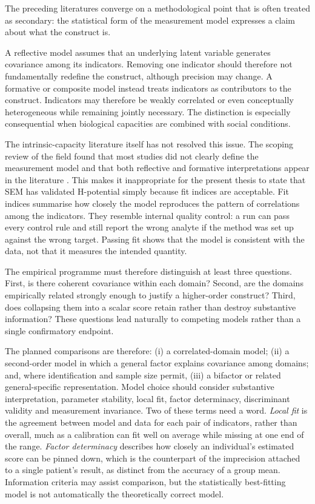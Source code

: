 The preceding literatures converge on a methodological point that is often treated as secondary: the statistical form of the measurement model expresses a claim about what the construct is.

A reflective model assumes that an underlying latent variable generates covariance among its indicators. Removing one indicator should therefore not fundamentally redefine the construct, although precision may change. A formative or composite model instead treats indicators as contributors to the construct. Indicators may therefore be weakly correlated or even conceptually heterogeneous while remaining jointly necessary. The distinction is especially consequential when biological capacities are combined with social conditions.

The intrinsic-capacity literature itself has not resolved this issue. The scoping review of the field found that most studies did not clearly define the measurement model and that both reflective and formative interpretations appear in the literature \citep{koivunen_2022}. This makes it inappropriate for the present thesis to state that SEM has validated H-potential simply because fit indices are acceptable. Fit indices summarise how closely the model reproduces the pattern of correlations among the indicators. They resemble internal quality control: a run can pass every control rule and still report the wrong analyte if the method was set up against the wrong target. Passing fit shows that the model is consistent with the data, not that it measures the intended quantity.

The empirical programme must therefore distinguish at least three questions. First, is there coherent covariance within each domain? Second, are the domains empirically related strongly enough to justify a higher-order construct? Third, does collapsing them into a scalar score retain rather than destroy substantive information? These questions lead naturally to competing models rather than a single confirmatory endpoint.

The planned comparisons are therefore: (i) a correlated-domain model; (ii) a second-order model in which a general factor explains covariance among domains; and, where identification and sample size permit, (iii) a bifactor or related general-specific representation. Model choice should consider substantive interpretation, parameter stability, local fit, factor determinacy, discriminant validity and measurement invariance. Two of these terms need a word. \emph{Local fit} is the agreement between model and data for each pair of indicators, rather than overall, much as a calibration can fit well on average while missing at one end of the range. \emph{Factor determinacy} describes how closely an individual's estimated score can be pinned down, which is the counterpart of the imprecision attached to a single patient's result, as distinct from the accuracy of a group mean. Information criteria may assist comparison, but the statistically best-fitting model is not automatically the theoretically correct model.

